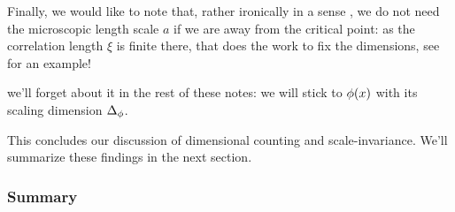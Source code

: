 \documentclass[12pt]{article}
\numberwithin{equation}{section}
\begin{document}
{Finally, we would like to note that, rather ironically in a sense , we do not need the microscopic length scale $a$ if we are away from the critical point: as the correlation length $\xi$ is finite there, that does the work to fix the dimensions, see  for an example!

} we'll forget about it in the rest of these notes: we will stick to $\phi(x)$ with its scaling dimension $\Delta_\phi$.


This concludes our discussion of dimensional counting and scale-invariance. We'll summarize these findings in the next section.

\subsubsection{Summary}
\end{document}
